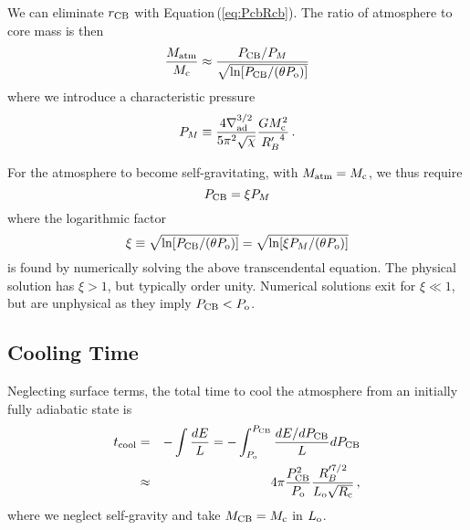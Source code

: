 \documentclass[12pt, preprint,numberedappendix]{emulateapj}
\newcommand{\Eq}[1]{Equation\,(\ref{#1})}
\newcommand{\delad}{\nabla_{\rm ad}}
\newcommand{\co}{_{\rm c}}
\newcommand{\di}{_{\rm o}}
\newcommand{\cb}{_{\rm CB}}
\begin{document}
We can eliminate $r\cb$ with \Eq{eq:PcbRcb}.  The ratio of atmosphere to core mass is then  
\begin{equation} \label{eq:crit}
{M_{\rm atm} \over M\co} \approx {P\cb /P_M \over  \sqrt{\ln[ P\cb/(\theta P\di)]}}
\end{equation} 
where we introduce a characteristic pressure
\begin{equation} 
P_M \equiv {4 \delad^{3/2} \over 5 \pi^2 \sqrt{\chi} } {G M\co^2 \over {R_B'}^4}\, .
\end{equation} 

For the atmosphere to become self-gravitating, with $M_{\rm atm} = M\co$, we thus require
\begin{equation} \label{eq:Pcbc}
P\cb = \xi P_M
\end{equation} 
where  the logarithmic factor
\begin{equation}\label{eq:xi}
\xi \equiv \sqrt{\ln[ P\cb/(\theta P\di)]} = \sqrt{\ln[ \xi P_M / (\theta P\di)]}
\end{equation} 
is found by numerically solving the above transcendental equation. The physical solution has $\xi >1$, but typically order unity. Numerical solutions exit for $\xi \ll 1$, but are unphysical as they imply $P\cb < P\di$.

\subsection{Cooling Time}
Neglecting surface terms, the total time to cool the atmosphere from an initially fully adiabatic state is
\begin{eqnarray} 
t_{\rm  cool} &=& -\int {d E \over L} = - \int_{P\di}^{P\cb } {d E/d P\cb \over L} dP\cb \\
&\approx& 4 \pi {P\cb^{2} \over P\di} {R_B'^{7/2} \over L\di \sqrt{R\co}} \label{eq:tcool}\, ,
\end{eqnarray} 
where we neglect self-gravity and take $M\cb = M\co$ in $L\di$.
\end{document}
